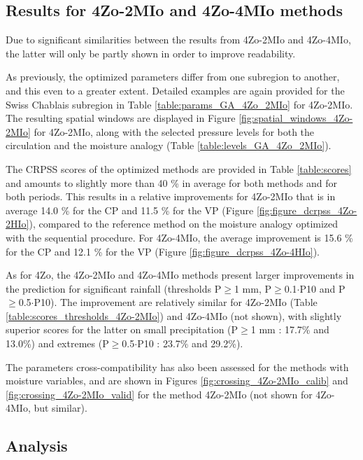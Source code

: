\documentclass[review]{elsarticle}
\begin{document}
\subsection{Results for 4Zo-2MIo and 4Zo-4MIo methods}

Due to significant similarities between the results from 4Zo-2MIo and 4Zo-4MIo, the latter will only be partly shown in order to improve readability.

As previously, the optimized parameters differ from one subregion to another, and this even to a greater extent. Detailed examples are again provided for the Swiss Chablais subregion in Table \ref{table:params_GA_4Zo_2MIo} for 4Zo-2MIo. The resulting spatial windows are displayed in Figure \ref{fig:spatial_windows_4Zo-2MIo} for 4Zo-2MIo, along with the selected pressure levels for both the circulation and the moisture analogy (Table \ref{table:levels_GA_4Zo_2MIo}). 

The CRPSS scores of the optimized methods are provided in Table \ref{table:scores} and amounts to slightly more than 40 \% in average for both methods and for both periods. This results in a relative improvements for 4Zo-2MIo that is in average 14.0 \% for the CP and 11.5 \% for the VP (Figure \ref{fig:figure_dcrpss_4Zo-2HIo}), compared to the reference method on the moisture analogy optimized with the sequential procedure. For 4Zo-4MIo, the average improvement is 15.6 \% for the CP and 12.1 \% for the VP (Figure \ref{fig:figure_dcrpss_4Zo-4HIo}). 

As for 4Zo, the 4Zo-2MIo and 4Zo-4MIo methods present larger improvements in the prediction for significant rainfall (thresholds P\(\geq\)1 mm, P\(\geq\)0.1\(\cdot\)P10 and P\(\geq\)0.5\(\cdot\)P10). The improvement are relatively similar for 4Zo-2MIo (Table \ref{table:scores_thresholds_4Zo-2MIo}) and 4Zo-4MIo (not shown), with slightly superior scores for the latter on small precipitation (P\(\geq\)1 mm : 17.7\% and 13.0\%) and extremes (P\(\geq\)0.5\(\cdot\)P10 : 23.7\% and 29.2\%).

The parameters cross-compatibility has also been assessed for the methods with moisture variables, and are shown in Figures \ref{fig:crossing_4Zo-2MIo_calib} and \ref{fig:crossing_4Zo-2MIo_valid} for the method 4Zo-2MIo (not shown for 4Zo-4MIo, but similar).


\subsection{Analysis}
\end{document}
